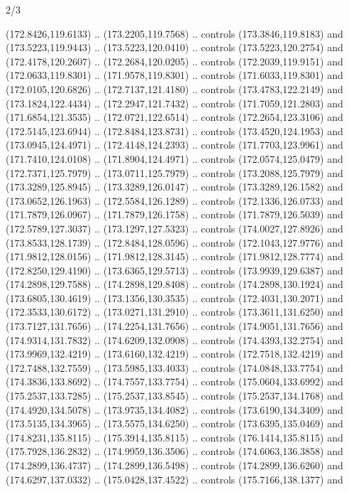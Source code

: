\begin{flagdescription}{2/3}
\begin{scope}[xshift=0.5\flaglength,yshift=0.5\flagwidth,scale=\flagwidth/180]
\begin{scope}[y=0.8pt, x=0.8pt, yscale=-1,shift={(-168.75,-108.75)}]
  (172.8426,119.6133) .. (173.2205,119.7568) .. controls (173.3846,119.8183) and
  (173.5223,119.9443) .. (173.5223,120.0410) .. controls (173.5223,120.2754) and
  (172.4178,120.2607) .. (172.2684,120.0205) .. controls (172.2039,119.9151) and
  (172.0633,119.8301) .. (171.9578,119.8301) .. controls (171.6033,119.8301) and
  (172.0105,120.6826) .. (172.7137,121.4180) .. controls (173.4783,122.2149) and
  (173.1824,122.4434) .. (172.2947,121.7432) .. controls (171.7059,121.2803) and
  (171.6854,121.3535) .. (172.0721,122.6514) .. controls (172.2654,123.3106) and
  (172.5145,123.6944) .. (172.8484,123.8731) .. controls (173.4520,124.1953) and
  (173.0945,124.4971) .. (172.4148,124.2393) .. controls (171.7703,123.9961) and
  (171.7410,124.0108) .. (171.8904,124.4971) .. controls (172.0574,125.0479) and
  (172.7371,125.7979) .. (173.0711,125.7979) .. controls (173.2088,125.7979) and
  (173.3289,125.8945) .. (173.3289,126.0147) .. controls (173.3289,126.1582) and
  (173.0652,126.1963) .. (172.5584,126.1289) .. controls (172.1336,126.0733) and
  (171.7879,126.0967) .. (171.7879,126.1758) .. controls (171.7879,126.5039) and
  (172.5789,127.3037) .. (173.1297,127.5323) .. controls (174.0027,127.8926) and
  (173.8533,128.1739) .. (172.8484,128.0596) .. controls (172.1043,127.9776) and
  (171.9812,128.0156) .. (171.9812,128.3145) .. controls (171.9812,128.7774) and
  (172.8250,129.4190) .. (173.6365,129.5713) .. controls (173.9939,129.6387) and
  (174.2898,129.7588) .. (174.2898,129.8408) .. controls (174.2898,130.1924) and
  (173.6805,130.4619) .. (173.1356,130.3535) .. controls (172.4031,130.2071) and
  (172.3533,130.6172) .. (173.0271,131.2910) .. controls (173.3611,131.6250) and
  (173.7127,131.7656) .. (174.2254,131.7656) .. controls (174.9051,131.7656) and
  (174.9314,131.7832) .. (174.6209,132.0908) .. controls (174.4393,132.2754) and
  (173.9969,132.4219) .. (173.6160,132.4219) .. controls (172.7518,132.4219) and
  (172.7488,132.7559) .. (173.5985,133.4033) .. controls (174.0848,133.7754) and
  (174.3836,133.8692) .. (174.7557,133.7754) .. controls (175.0604,133.6992) and
  (175.2537,133.7285) .. (175.2537,133.8545) .. controls (175.2537,134.1768) and
  (174.4920,134.5078) .. (173.9735,134.4082) .. controls (173.6190,134.3409) and
  (173.5135,134.3965) .. (173.5575,134.6250) .. controls (173.6395,135.0469) and
  (174.8231,135.8115) .. (175.3914,135.8115) .. controls (176.1414,135.8115) and
  (175.7928,136.2832) .. (174.9959,136.3506) .. controls (174.6063,136.3858) and
  (174.2899,136.4737) .. (174.2899,136.5498) .. controls (174.2899,136.6260) and
  (174.6297,137.0332) .. (175.0428,137.4522) .. controls (175.7166,138.1377) and

\end{scope}
\end{scope}
\end{flagdescription}
